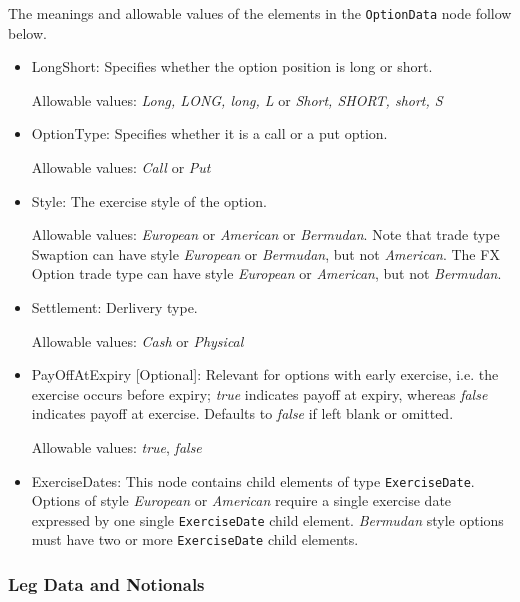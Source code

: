 The meanings and allowable values of the elements in the \lstinline!OptionData! node follow below.

\begin{itemize}
\item LongShort: Specifies whether the option position is long  or
  short.  

Allowable values: \emph{Long, LONG, long, L} or \emph{Short, SHORT,
  short, S}

\item OptionType: Specifies whether it is a call or a put option. 

Allowable values: \emph{Call} or \emph{Put} 

\item Style: The exercise style of the option. 

  Allowable values: \emph{European} or \emph{American} or \emph{Bermudan}. Note that trade type Swaption can have style
  \emph{European} or \emph{Bermudan}, but not \emph{American}. The FX Option trade type can have style \emph{European}
  or \emph{American}, but not \emph{Bermudan}.

\item Settlement: Derlivery type. 

Allowable values: \emph{Cash} or \emph{Physical} 

\item PayOffAtExpiry [Optional]: Relevant for options with early
  exercise, i.e. the exercise occurs before expiry; \emph{true}
  indicates payoff at expiry, whereas \emph{false}  indicates payoff
  at exercise. Defaults to \emph{false}  if left blank or omitted. 

Allowable values: \emph{true}, \emph{false}

\item ExerciseDates: This node contains child elements of type
  \lstinline!ExerciseDate!.  Options of style \emph{European} or
  \emph{American} require a single exercise date expressed by one
  single \lstinline!ExerciseDate! child element.  \emph{Bermudan}
  style options must have two or more \lstinline!ExerciseDate! child
  elements.

\end{itemize}



\subsubsection{Leg Data and Notionals}
\label{ss:leg_data}

